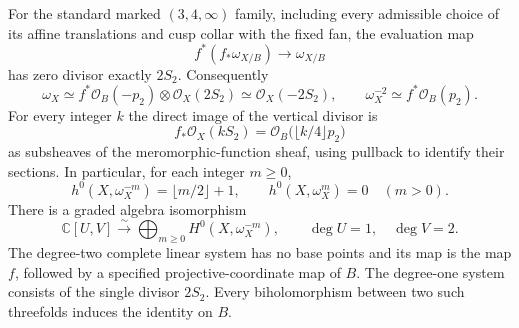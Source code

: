 
\begin{proposition}
\hypertarget{tag-01PZ}{}\label{fam:src:A.1.1}\label{fam:st:A.1.1}\hypertarget{tag-03DM}{}\label{wb:thm:canonical-ring-recovery}


For the standard marked $(3,4,\infty)$ family, including every admissible
choice of its affine translations and cusp collar with the fixed fan,
the evaluation map
\[
 f^*(f_*\omega_{X/B})\longrightarrow\omega_{X/B}
\]
has zero divisor exactly $2S_2$. Consequently
\begin{equation}
 \omega_X\simeq f^*\mathcal O_B(-p_2)\otimes\mathcal O_X(2S_2)
       \simeq\mathcal O_X(-2S_2),\qquad
 \omega_X^{-2}\simeq f^*\mathcal O_B(p_2).
\label{pub:I:eq:CR1}
\end{equation}
For every integer $k$ the direct image of the vertical divisor is
\begin{equation}
 f_*\mathcal O_X(kS_2)
       =\mathcal O_B\bigl(\lfloor k/4\rfloor p_2\bigr)
\label{pub:I:eq:CR2}
\end{equation}
as subsheaves of the meromorphic-function sheaf, using pullback to identify
their sections. In particular, for each integer $m\geq0$,
\begin{equation}
 h^0(X,\omega_X^{-m})=\lfloor m/2\rfloor+1,
 \qquad h^0(X,\omega_X^m)=0\quad(m>0).
\label{pub:I:eq:CR3}
\end{equation}
There is a graded algebra isomorphism
\begin{equation}
 \mathbb C[U,V]\xrightarrow{\sim}
       \bigoplus_{m\geq0}H^0(X,\omega_X^{-m}),
       \qquad\deg U=1,\quad\deg V=2.
\label{pub:I:eq:CR4}
\end{equation}
The degree-two complete linear system has no base points and its map is
the map $f$, followed by a specified projective-coordinate map of $B$.
The degree-one system consists of the single divisor $2S_2$.
Every biholomorphism between two such threefolds induces the identity
on $B$.
\end{proposition}

